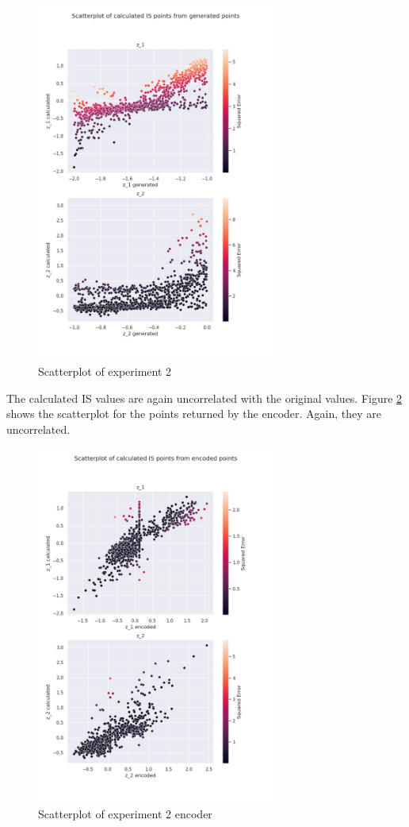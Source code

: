 \begin{figure}[H]
    \centering
    \includegraphics[width=0.7\textwidth]{Cap5/scatterplot2}
    \caption{Scatterplot of experiment 2}
    \label{fig:scatter_exp2}
\end{figure}

The calculated IS values are again uncorrelated with the original values. Figure \ref{fig:scatter_enc_exp2} shows the scatterplot for the points returned by the encoder. Again, they are uncorrelated.

\begin{figure}[H]
    \centering
    \includegraphics[width=0.7\textwidth]{Cap5/scatterplot_enc2}
    \caption{Scatterplot of experiment 2 encoder}
    \label{fig:scatter_enc_exp2}
\end{figure}

